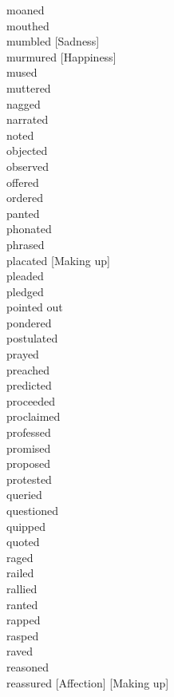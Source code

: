 moaned \hfill \\
mouthed \hfill \\
mumbled [Sadness] \hfill \\
murmured [Happiness] \hfill \\
mused \hfill \\
muttered \hfill \\
nagged \hfill \\
narrated \hfill \\
noted \hfill \\
objected \hfill \\
observed \hfill \\
offered \hfill \\
ordered \hfill \\
panted \hfill \\
phonated \hfill \\
phrased \hfill \\
placated [Making up] \hfill \\
pleaded \hfill \\
pledged \hfill \\
pointed out \hfill \\
pondered \hfill \\
postulated \hfill \\
prayed \hfill \\
preached \hfill \\
predicted \hfill \\
proceeded \hfill \\
proclaimed \hfill \\
professed \hfill \\
promised \hfill \\
proposed \hfill \\
protested \hfill \\
queried \hfill \\
questioned \hfill \\
quipped \hfill \\
quoted \hfill \\
raged \hfill \\
railed \hfill \\
rallied \hfill \\
ranted \hfill \\
rapped \hfill \\
rasped \hfill \\
raved \hfill \\
reasoned \hfill \\
reassured [Affection] [Making up] \hfill \\
